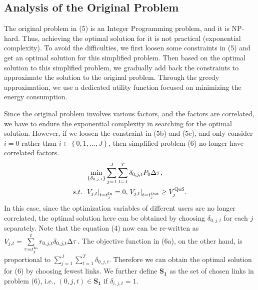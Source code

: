 \documentclass[journal]{IEEEtran}
\begin{document}
   \subsection{Analysis of the Original Problem}
   
   The original problem in (5) is an Integer Programming problem, and it is NP-hard. %
   Thus, achieving the optimal solution for it is not practical (exponential complexity). To avoid the difficulties, we first loosen some constraints in (5) and get an optimal solution for this simplified problem. Then based on the optimal solution to this simplified problem, we gradually add back the constraints to approximate the solution to the original problem. Through the greedy approximation, we use a dedicated utility function focused on minimizing the energy consumption. 
   
   Since the original problem involves various factors, and the factors are correlated, we have to endure the exponential complexity in searching for the optimal solution. However, if we loosen the constraint in (5b) and (5c), and only consider $i=0$ rather than $i \in \left\{ {0,1,...,J} \right\}$, then simplified problem (6) no-longer have correlated factors. 
   \begin{subequations}
    \begin{align}
    & \mathop {\min }\limits_{\left\{ {{\delta _{0,j,t}}} \right\}}  {\sum\limits_{j = 1}^J {\sum\limits_{t = 1}^{T} {\delta _{0,j,t} P_{0} \Delta \tau } } }  ,\\
     {s.t.} \;\; &{{{\left. {{V_{j,t}}} \right|}_{t = t_j^{{\rm{In}}}}} = 0,\left. { {V_{j,t}}} \right|_{t = t_j^{{\rm{Out}}}}} \ge V_j^{\rm{QoS}}.
    \end{align}
   \end{subequations}
   In this case, since the optimization variables of different users are no longer correlated, the optimal solution here can be obtained by choosing $\delta _{0,j,t}$ for each $j$ separately. Note that the equation (4) now can be re-written as ${V_{j,t}=\sum\limits_{\tau = t_j^{{\rm{In}}}}^t {r_{0,j,t} \delta _{0,j,t}}\Delta \tau}$. The objective function in (6a), on the other hand, is proportional to ${\sum \limits_{j = 1}^J {\sum\limits_{t = 1}^{T} {\delta _{0,j,t} }}}$. Therefore we can obtain the optimal solution for (6) by choosing fewest links. 
   We further define ${{\mathbf{S}}_{\mathbf{1}}}$ as the set of chosen links in problem (6), i.e., $\left( {0,j,t} \right) \in {\mathbf{S}}_{\mathbf{1}}$ if ${\delta _{i,j,t} = 1}$. 
   
\end{document}
